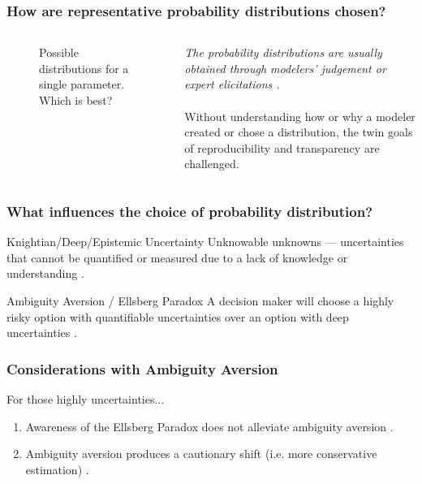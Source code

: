 \begin{frame}
    \frametitle{How are representative probability distributions chosen?}

    \begin{columns}
        \column[t]{5cm}
        \begin{figure}
            \centering
            \resizebox{\columnwidth}{!}{
                
            }
            \caption{Possible distributions for a single parameter. Which is best?}
            \label{fig:many-distributions}
        \end{figure}
        \column[t]{5cm}
            \textit{The probability distributions are usually obtained through modelers'
            judgement or expert elicitations \cite{yue_review_2018}.}\\~\\

             Without understanding how or why a modeler created or 
            chose a distribution, the twin goals of reproducibility and transparency are
            challenged.
    \end{columns}

\end{frame}

\begin{frame}
    \frametitle{What influences the choice of probability distribution?}
        \begin{block}{Knightian/Deep/Epistemic Uncertainty}
            Unknowable unknowns --- uncertainties that cannot be quantified or measured due to a 
            lack of knowledge or understanding \cite{knight_risk_1921}. 
        \end{block}
        \pause
        \begin{block}{Ambiguity Aversion / Ellsberg Paradox}
            A decision maker will choose a highly risky option with quantifiable uncertainties
            over an option with deep uncertainties \cite{ellsberg_risk_1961}.
        \end{block}
\end{frame}


\begin{frame}
    \frametitle{Considerations with Ambiguity Aversion}

    For those highly  uncertainties...

    \begin{enumerate}
        \item Awareness of the Ellsberg Paradox does not alleviate ambiguity aversion \cite{jia_learning_2020}.
        \item Ambiguity aversion produces a cautionary shift (i.e. more conservative estimation) \cite{keller_examination_2007}.
    \end{enumerate}

\end{frame}
